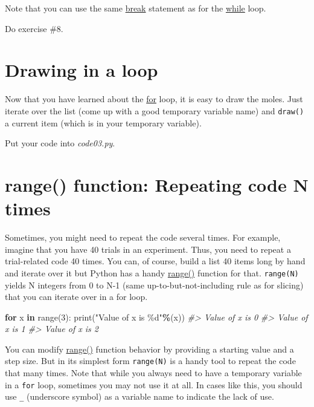 \documentclass[
]{book}
\newenvironment{Shaded}{\begin{snugshade}}{\end{snugshade}}
\newcommand{\BuiltInTok}[1]{#1}
\newcommand{\CommentTok}[1]{\textcolor[rgb]{0.56,0.35,0.01}{\textit{#1}}}
\newcommand{\ControlFlowTok}[1]{\textcolor[rgb]{0.13,0.29,0.53}{\textbf{#1}}}
\newcommand{\DecValTok}[1]{\textcolor[rgb]{0.00,0.00,0.81}{#1}}
\newcommand{\KeywordTok}[1]{\textcolor[rgb]{0.13,0.29,0.53}{\textbf{#1}}}
\newcommand{\NormalTok}[1]{#1}
\newcommand{\OperatorTok}[1]{\textcolor[rgb]{0.81,0.36,0.00}{\textbf{#1}}}
\newcommand{\SpecialCharTok}[1]{\textcolor[rgb]{0.00,0.00,0.00}{#1}}
\newcommand{\StringTok}[1]{\textcolor[rgb]{0.31,0.60,0.02}{#1}}
\begin{document}
Note that you can use the same \href{https://docs.python.org/3/tutorial/controlflow.html?highlight=loop\#break-and-continue-statements-and-else-clauses-on-loops}{break} statement as for the \href{https://docs.python.org/3/reference/compound_stmts.html\#the-while-statement}{while} loop.

Do exercise \#8.

\hypertarget{drawing-in-a-loop}{%
\section{Drawing in a loop}\label{drawing-in-a-loop}}

Now that you have learned about the \protect\hyperlink{for-loop}{for} loop, it is easy to draw the moles. Just iterate over the list (come up with a good temporary variable name) and \texttt{draw()} a current item (which is in your temporary variable).

Put your code into \emph{code03.py}.

\hypertarget{range}{%
\section{range() function: Repeating code N times}\label{range}}

Sometimes, you might need to repeat the code several times. For example, imagine that you have 40 trials in an experiment. Thus, you need to repeat a trial-related code 40 times. You can, of course, build a list 40 items long by hand and iterate over it but Python has a handy \href{https://docs.python.org/3/tutorial/controlflow.html?highlight=loop\#the-range-function}{range()} function for that. \texttt{range(N)} yields N integers from 0 to N-1 (same up-to-but-not-including rule as for slicing) that you can iterate over in a for loop.

\begin{Shaded}
\begin{Highlighting}[]
\ControlFlowTok{for}\NormalTok{ x }\KeywordTok{in} \BuiltInTok{range}\NormalTok{(}\DecValTok{3}\NormalTok{):}
    \BuiltInTok{print}\NormalTok{(}\StringTok{"Value of x is }\SpecialCharTok{\%d}\StringTok{"}\OperatorTok{\%}\NormalTok{(x))}
\CommentTok{\#\textgreater{} Value of x is 0}
\CommentTok{\#\textgreater{} Value of x is 1}
\CommentTok{\#\textgreater{} Value of x is 2}
\end{Highlighting}
\end{Shaded}

You can modify \href{https://docs.python.org/3/library/stdtypes.html\#range}{range()} function behavior by providing a starting value and a step size. But in its simplest form \texttt{range(N)} is a handy tool to repeat the code that many times. Note that while you always need to have a temporary variable in a \texttt{for} loop, sometimes you may not use it at all. In cases like this, you should use \texttt{\_} (underscore symbol) as a variable name to indicate the lack of use.
\end{document}
